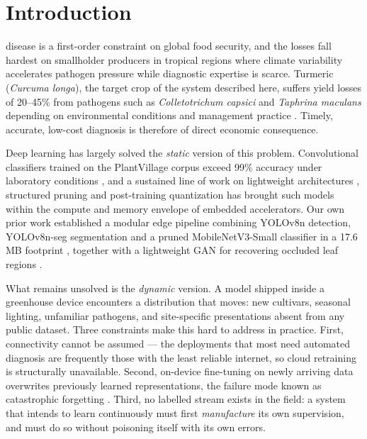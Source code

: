 \documentclass[journal]{IEEEtran}
\begin{document}
\IEEEpeerreviewmaketitle

\section{Introduction}
\label{sec:intro}

 disease is a first-order constraint on global food security,
and the losses fall hardest on smallholder producers in tropical regions where
climate variability accelerates pathogen pressure while diagnostic expertise is
scarce. Turmeric (\textit{Curcuma longa}), the target crop of the system described
here, suffers yield losses of 20--45\% from pathogens such as
\textit{Colletotrichum capsici} and \textit{Taphrina maculans} depending on
environmental conditions and management practice \cite{ref21}. Timely, accurate,
low-cost diagnosis is therefore of direct economic consequence.

Deep learning has largely solved the \emph{static} version of this problem.
Convolutional classifiers trained on the PlantVillage corpus \cite{ref1} exceed
99\% accuracy under laboratory conditions \cite{ref2}, and a sustained line of work
on lightweight architectures \cite{ref6}, structured pruning \cite{ref7} and
post-training quantization \cite{ref8} has brought such models within the compute
and memory envelope of embedded accelerators. Our own prior work established a
modular edge pipeline combining YOLOv8n detection, YOLOv8n-seg segmentation and a
pruned MobileNetV3-Small classifier in a 17.6\,MB footprint \cite{ref21}, together
with a lightweight GAN for recovering occluded leaf regions \cite{ref22}.

What remains unsolved is the \emph{dynamic} version. A model shipped inside a
greenhouse device encounters a distribution that moves: new cultivars, seasonal
lighting, unfamiliar pathogens, and site-specific presentations absent from any
public dataset. Three constraints make this hard to address in practice.
First, connectivity cannot be assumed --- the deployments that most need automated
diagnosis are frequently those with the least reliable internet, so cloud retraining
is structurally unavailable. Second, on-device fine-tuning on newly arriving data
overwrites previously learned representations, the failure mode known as
catastrophic forgetting \cite{ref13}. Third, no labelled stream exists in the field:
a system that intends to learn continuously must first \emph{manufacture} its own
supervision, and must do so without poisoning itself with its own errors.
\end{document}
